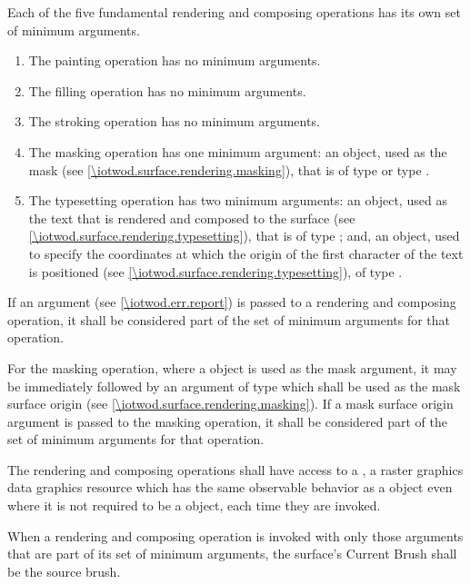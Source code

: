\pnum
Each of the five fundamental rendering and composing operations has its own set of minimum arguments.
\begin{enumerate}
	\item The painting operation has no minimum arguments.
	\item The filling operation has no minimum arguments.
	\item The stroking operation has no minimum arguments.
	\item The masking operation has one minimum argument: an object, used as the mask (see \ref{\iotwod.surface.rendering.masking}), that is of type  or type .
	\item The typesetting operation has two minimum arguments: an object, used as the text that is rendered and composed to the surface (see \ref{\iotwod.surface.rendering.typesetting}), that is of type ; and, an object, used to specify the coordinates at which the origin of the first character of the text is positioned (see \ref{\iotwod.surface.rendering.typesetting}), of type .
\end{enumerate}

\pnum
If an  argument (see \ref{\iotwod.err.report}) is passed to a rendering and composing operation, it shall be considered part of the set of minimum arguments for that operation.

\pnum
For the masking operation, where a  object is used as the mask argument, it may be immediately followed by an argument of type  which shall be used as the mask surface origin (see \ref{\iotwod.surface.rendering.masking}). If a mask surface origin argument is passed to the masking operation, it shall be considered part of the set of minimum arguments for that operation.

\pnum
The rendering and composing operations shall have access to a , a raster graphics data graphics resource which has the same observable behavior as a  object even where it is not required to be a  object, each time they are invoked.

\pnum
When a rendering and composing operation is invoked with only those arguments that are part of its set of minimum arguments, the surface's Current Brush shall be the source brush.

